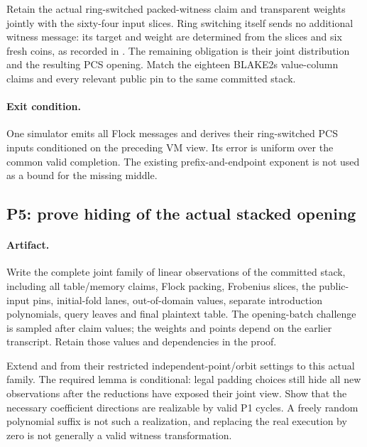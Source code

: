 Retain the actual ring-switched packed-witness claim and transparent weights jointly with the sixty-four input slices. Ring switching itself sends no additional witness message: its target and weight are determined from the slices and six fresh coins, as recorded in . The remaining obligation is their joint distribution and the resulting PCS opening. Match the eighteen BLAKE2s value-column claims and every relevant public pin to the same committed stack.

\paragraph{Exit condition.} One simulator emits all Flock messages and derives their ring-switched PCS inputs conditioned on the preceding VM view. Its error is uniform over the common valid completion. The existing prefix-and-endpoint exponent is not used as a bound for the missing middle.

\subsection{P5: prove hiding of the actual stacked opening}

\paragraph{Artifact.} Write the complete joint family of linear observations of the committed stack, including all table/memory claims, Flock packing, Frobenius slices, the public-input pins, initial-fold lanes, out-of-domain values, separate introduction polynomials, query leaves and final plaintext table. The opening-batch challenge is sampled after claim values; the weights and points depend on the earlier transcript. Retain those values and dependencies in the proof.

Extend  and  from their restricted independent-point/orbit settings to this actual family. The required lemma is conditional: legal padding choices still hide all new observations after the reductions have exposed their joint view. Show that the necessary coefficient directions are realizable by valid P1 cycles. A freely random polynomial suffix is not such a realization, and replacing the real execution by zero is not generally a valid witness transformation.


